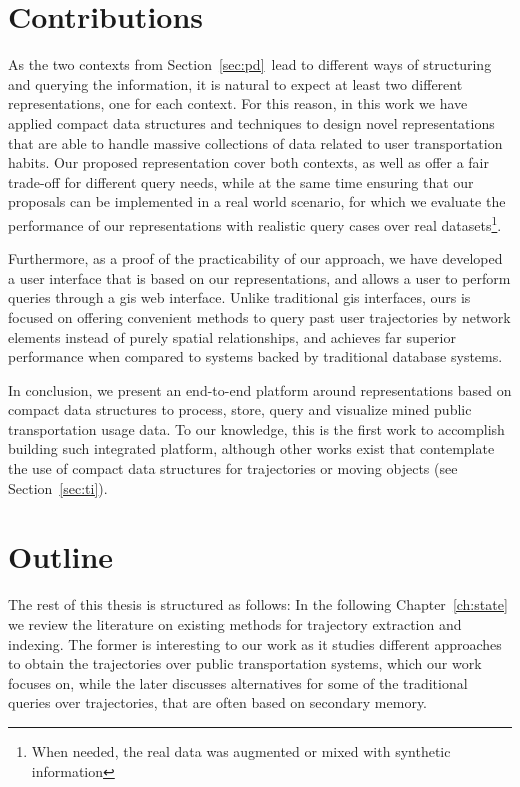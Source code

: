 \documentclass[a4paper,10pt,twoside]{book}
\begin{document}
	\section{Contributions}
	As the two contexts from Section~\ref{sec:pd}~lead to different ways of structuring and querying the information, it is natural to expect at least two different representations, one for each context. For this reason, in this work we have applied compact data structures and techniques to design novel representations that are able to handle massive collections of data related to user transportation habits. Our proposed representation cover both contexts, as well as offer a fair trade-off for different query needs, while at the same time ensuring that our proposals can be implemented in a real world scenario, for which we evaluate the performance of our representations with realistic query cases over real datasets\footnote{When needed, the real data was augmented or mixed with synthetic information}.
	
	Furthermore, as a proof of the practicability of our approach, we have developed a user interface that is based on our representations, and allows a user to perform queries through a \gls{gis} web interface. Unlike traditional \gls{gis} interfaces, ours is focused on offering convenient methods to query past user trajectories by network elements instead of purely spatial relationships, and achieves far superior performance when compared to systems backed by traditional database systems.
	
	In conclusion, we present an end-to-end platform around representations based on compact data structures to process, store, query and visualize mined public transportation usage data. To our knowledge, this is the first work to accomplish building such integrated platform, although other works exist that contemplate the use of compact data structures for trajectories or moving objects (see Section~\ref{sec:ti}).
	
	\section{Outline}
	The rest of this thesis is structured as follows: In the following Chapter~\ref{ch:state} we review the literature on existing methods for trajectory extraction and indexing. The former is interesting to our work as it studies different approaches to obtain the trajectories over public transportation systems, which our work focuses on, while the later discusses alternatives for some of the traditional queries over trajectories, that are often based on secondary memory.
	
\end{document}
